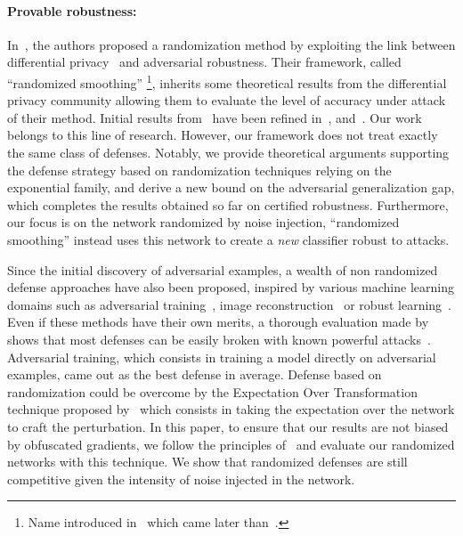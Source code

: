 \paragraph{Provable robustness:}
In~\cite{lecuyer2018certified}, the authors proposed a randomization method by exploiting the link between differential privacy~\cite{dwork2014algorithmic} and adversarial robustness.
Their framework, called ``randomized smoothing'' \footnote{Name introduced in~\cite{KolterRandomizedSmoothing} which came later than~\cite{lecuyer2018certified}.}, inherits some theoretical results from the differential privacy community allowing them to evaluate the level of accuracy under attack of their method.
Initial results from~\cite{lecuyer2018certified} have been refined in~\cite{SecondOrdercertifiedrobustness}, and~\cite{KolterRandomizedSmoothing}.
Our work belongs to this line of research.
However, our framework does not treat exactly the same class of defenses.
Notably, we provide theoretical arguments supporting the defense strategy based on randomization techniques relying on the exponential family, and derive a new bound on the adversarial generalization gap, which completes the results obtained so far on certified robustness.
Furthermore, our focus is on the network randomized by noise injection, ``randomized smoothing'' instead uses this network to create a \emph{new} classifier robust to attacks.

Since the initial discovery of adversarial examples, a wealth of non randomized defense approaches have also been proposed, inspired by various machine learning domains such as adversarial training~\cite{goodfellow2014explaining,madry2018towards}, image reconstruction~\cite{meng2017magnet,Samangouei2018DefenseGAN} or robust learning~\cite{goodfellow2014explaining,madry2018towards}.
Even if these methods have their own merits, a thorough evaluation made by~\cite{athalye2018obfuscated} shows that most defenses can be easily broken with known powerful attacks~\cite{madry2018towards,carlini2017towards,chen2018ead}.
Adversarial training, which consists in training a model directly on adversarial examples, came out as the best defense in average.
Defense based on randomization could be overcome by the Expectation Over Transformation technique proposed by~\cite{athalye2017synthesizing} which consists in taking the expectation over the network to craft the perturbation.
In this paper, to ensure that our results are not biased by obfuscated gradients, we follow the principles of~\cite{athalye2018obfuscated,carlini2019evaluating} and evaluate our randomized networks with this technique.
We show that randomized defenses are still competitive given the intensity of noise injected in the network. 

